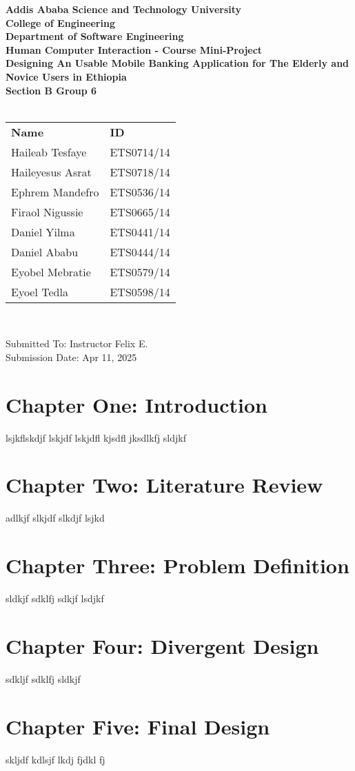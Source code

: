 \documentclass[a4paper,12pt]{article}
\begin{document}
\begin{titlepage}
  \centering
  {\large\bfseries Addis Ababa Science and Technology University} \\
  {\large\bfseries College of Engineering} \\
  {\large\bf Department of Software Engineering} \\[5mm]
  {\Large\bf Human Computer Interaction - Course Mini-Project} \\[5mm]
  {\Huge\bfseries Designing An Usable Mobile Banking Application for The Elderly and Novice Users in Ethiopia} \\ [2.5cm]
  {\Large\bfseries Section B Group 6 } \\[2.5mm]
  {\Large\bfseries{}} \\ [5mm]
  \begin{tabular}{ll}
    \large\textbf{Name}     & \large\textbf{ID} \\
    \large Haileab Tesfaye  & \large ETS0714/14 \\
    \large Haileyesus Asrat & \large ETS0718/14 \\
    \large Ephrem Mandefro  & \large ETS0536/14 \\
    \large Firaol Nigussie  & \large ETS0665/14 \\
    \large Daniel Yilma     & \large ETS0441/14 \\
    \large Daniel Ababu     & \large ETS0444/14 \\
    \large Eyobel Mebratie  & \large ETS0579/14 \\
    \large Eyoel Tedla      & \large ETS0598/14 \\
  \end{tabular} \\[5cm]

  \begin{flushright}
    {\large Submitted To: Instructor Felix E.}\\
    {\large Submission Date: Apr 11, 2025}
  \end{flushright}

\end{titlepage}

\tableofcontents

\newpage
\section*{Chapter One: Introduction}
lsjkflskdjf lskjdf lskjdfl kjsdfl jksdlkfj sldjkf
\vfill

\newpage
\section*{Chapter Two: Literature Review}
adlkjf slkjdf slkdjf lsjkd
\vfill

\newpage
\section*{Chapter Three: Problem Definition}
sldkjf sdklfj sdkjf lsdjkf
\vfill

\newpage
\section*{Chapter Four: Divergent Design}
sdkljf sdklfj sldkjf
\vfill

\newpage
\section*{Chapter Five: Final Design}
skljdf kdlsjf lkdj fjdkl fj
\vfill
\end{document}

